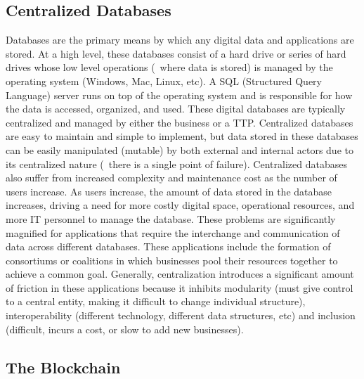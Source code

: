 \subsection{Centralized Databases}
Databases are the primary means by which any digital data and applications are stored. At a high level, these databases consist of a hard drive or series of hard drives whose low level operations (\ie\ where data is stored) is managed by the operating system (Windows, Mac, Linux, etc). A SQL (Structured Query Language) server runs on top of the operating system and is responsible for how the data is accessed, organized, and used. These digital databases are typically centralized and managed by either the business or a TTP. Centralized databases are easy to maintain and simple to implement, but data stored in these databases can be easily manipulated (mutable) by both external and internal actors due to its centralized nature (\ie\ there is a single point of failure). Centralized databases also suffer from increased complexity and maintenance cost as the number of users increase. As users increase, the amount of data stored in the database increases, driving a need for more costly digital space, operational resources, and more IT personnel to manage the database. These problems are significantly magnified for applications that require the interchange and communication of data across different databases. These applications include the formation of consortiums or coalitions in which businesses pool their resources together to achieve a common goal. Generally, centralization introduces a significant amount of friction in these applications because it inhibits modularity (must give control to a central entity, making it difficult to change individual structure), interoperability (different technology, different data structures, etc) and inclusion (difficult, incurs a cost, or slow to add new businesses).

\subsection{The Blockchain}

